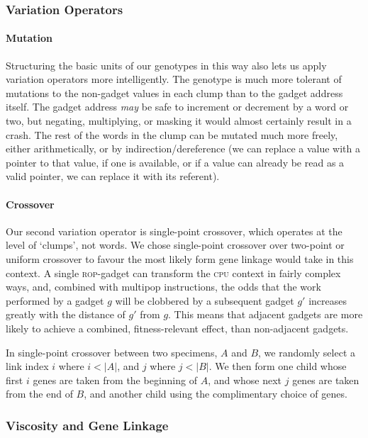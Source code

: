 \subsubsection{Variation Operators}
\paragraph{Mutation}
Structuring the basic units of our genotypes in this way also
lets us apply variation operators more intelligently. The
genotype is much more tolerant of mutations to the non-gadget
values in each clump than to the gadget address itself. The
gadget address \emph{may} be safe to increment or decrement by a
word or two, but negating, multiplying, or masking it would
almost certainly result in a crash. The rest of the words in the
clump can be mutated much more freely, either arithmetically, or
by indirection/dereference (we can replace a value with a pointer
to that value, if one is available, or if a value can already be
read as a valid pointer, we can replace it with its referent).

\paragraph{Crossover}
Our second variation operator is single-point crossover, which
operates at the level of `clumps', not words. We chose
single-point crossover over two-point or uniform crossover
to favour the most likely form gene linkage would take in this
context. A single \textsc{rop}-gadget can transform the \textsc{cpu} context in
fairly complex ways, and, combined with multipop instructions,
the odds that the work performed by a gadget $g$ will be
clobbered by a subsequent gadget $g'$ increases greatly with the
distance of $g'$ from $g$. This means that adjacent gadgets are
more likely to achieve a combined, fitness-relevant effect, than
non-adjacent gadgets. 

In single-point crossover between two specimens, $A$ and $B$, we
randomly select a link index $i$ where $i < |A|$, and $j$ where $j
< |B|$. We then form one child whose first $i$ genes are taken
from the beginning of $A$, and whose next $j$ genes are taken
from the end of $B$, and another child using the complimentary
choice of genes. 

\subsubsection{Viscosity and Gene Linkage}

